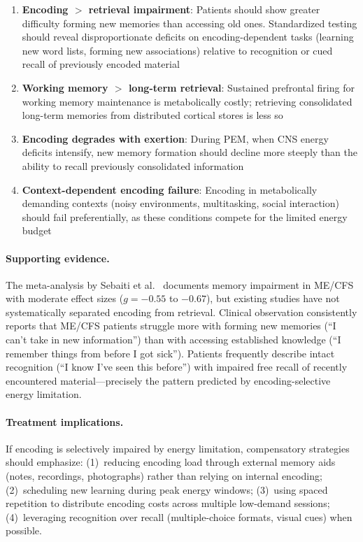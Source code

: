 \begin{hypothesis}
\begin{enumerate}
    \item \textbf{Encoding $>$ retrieval impairment}: Patients should show greater difficulty forming new memories than accessing old ones. Standardized testing should reveal disproportionate deficits on encoding-dependent tasks (learning new word lists, forming new associations) relative to recognition or cued recall of previously encoded material
    \item \textbf{Working memory $>$ long-term retrieval}: Sustained prefrontal firing for working memory maintenance is metabolically costly; retrieving consolidated long-term memories from distributed cortical stores is less so
    \item \textbf{Encoding degrades with exertion}: During PEM, when CNS energy deficits intensify, new memory formation should decline more steeply than the ability to recall previously consolidated information
    \item \textbf{Context-dependent encoding failure}: Encoding in metabolically demanding contexts (noisy environments, multitasking, social interaction) should fail preferentially, as these conditions compete for the limited energy budget
\end{enumerate}

\paragraph{Supporting evidence.}
The meta-analysis by Sebaiti et al.~\cite{Sebaiti2022cognitive} documents memory impairment in ME/CFS with moderate effect sizes ($g = -0.55$ to $-0.67$), but existing studies have not systematically separated encoding from retrieval. Clinical observation consistently reports that ME/CFS patients struggle more with forming new memories (``I can't take in new information'') than with accessing established knowledge (``I remember things from before I got sick''). Patients frequently describe intact recognition (``I know I've seen this before'') with impaired free recall of recently encountered material---precisely the pattern predicted by encoding-selective energy limitation.

\paragraph{Treatment implications.}
If encoding is selectively impaired by energy limitation, compensatory strategies should emphasize: (1)~reducing encoding load through external memory aids (notes, recordings, photographs) rather than relying on internal encoding; (2)~scheduling new learning during peak energy windows; (3)~using spaced repetition to distribute encoding costs across multiple low-demand sessions; (4)~leveraging recognition over recall (multiple-choice formats, visual cues) when possible.


\end{hypothesis}
